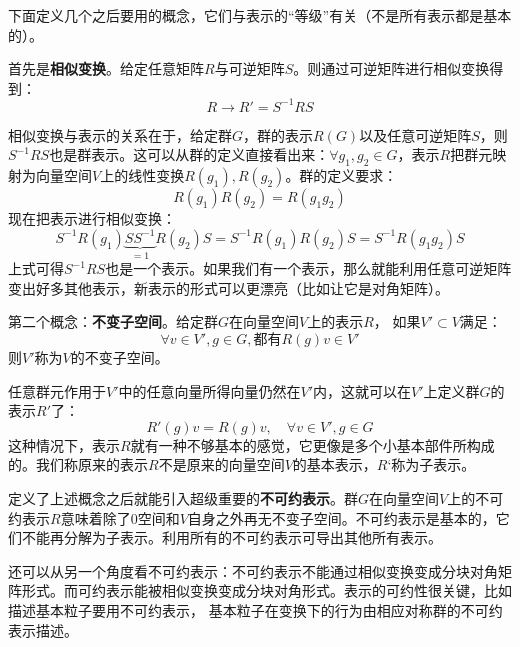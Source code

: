 下面定义几个之后要用的概念，它们与表示的“等级”有关（不是所有表示都是基本的）。


首先是{\bfseries 相似变换}。给定任意矩阵$R$与可逆矩阵$S$。则通过可逆矩阵进行相似变换得到：
\begin{equation}
\label{equ3.89}
R \rightarrow R' = S^{-1} RS
\end{equation}

相似变换与表示的关系在于，给定群$G$，群的表示$R(G)$以及任意可逆矩阵$S$，则$S^{-1} RS$也是群表示。这可以从群的定义直接看出来：$\forall g_1, g_2 \in G$，表示$R$把群元映射为向量空间$V$上的线性变换$R(g_1),R(g_2)$。群的定义要求：
\begin{equation}
\label{equ3.90}
R(g_1) R(g_2) = R(g_1 g_2)
\end{equation}
现在把表示进行相似变换：
\begin{equation}
\label{equ3.91}
S^{-1} R(g_1) \underbrace{SS^{-1}}_{=1} R(g_2) S = S^{-1} R(g_1) R(g_2) S = S^{-1} R(g_1 g_2) S
\end{equation}
上式可得$S^{-1} RS$也是一个表示。如果我们有一个表示，那么就能利用任意可逆矩阵变出好多其他表示，新表示的形式可以更漂亮（比如让它是对角矩阵）。

第二个概念：{\bfseries 不变子空间}。给定群$G$在向量空间$V$上的表示$R$， 如果$V' \subset V$满足：
\[
\forall v \in V', g \in G, \text{都有} R(g)v \in V'
\]
则$V'$称为$V$的不变子空间。

任意群元作用于$V'$中的任意向量所得向量仍然在$V'$内，这就可以在$V'$上定义群$G$的表示$R'$了：
\begin{equation}
\label{equ3.92}
R'(g) v = R(g) v,\quad \forall v \in V', g \in G
\end{equation}
这种情况下，表示$R$就有一种不够基本的感觉，它更像是多个小基本部件所构成的。我们称原来的表示$R$不是原来的向量空间$V$的基本表示，$R‘$称为子表示。%

定义了上述概念之后就能引入超级重要的{\bfseries 不可约表示}。群$G$在向量空间$V$上的不可约表示$R$意味着除了$0$空间和$V$自身之外再无不变子空间。不可约表示是基本的，它们不能再分解为子表示。利用所有的不可约表示可导出其他所有表示。

还可以从另一个角度看不可约表示：不可约表示不能通过相似变换变成分块对角矩阵形式。而可约表示能被相似变换变成分块对角形式。表示的可约性很关键，比如描述基本粒子要用不可约表示，%
基本粒子在变换下的行为由相应对称群的不可约表示描述。

